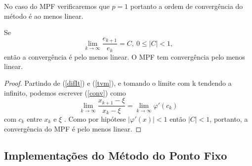 No caso do MPF verificaremos que $p = 1$ portanto a ordem de convergência do método é ao menos linear.
\begin{prop}
    Se 
    \begin{equation}\label{conv}
        \lim_{k \to \infty} \frac{e_{k+1}}{e_k} = C, \ 0 \leq |C| < 1,
    \end{equation}
    então a convergência é pelo menos linear. O MPF tem convergência pelo menos linear.
\end{prop}
\begin{proof}
Partindo de (\ref{difIt}) e (\ref{tvm}), e tomando o  limite com k tendendo a infinito, podemos escrever (\ref{conv}) como
\begin{equation*} %
    \lim_{k \to \infty} \frac{x_{k+1} - \xi}{x_k - \xi} = \lim_{k \to \infty}\varphi'(c_k)
\end{equation*} %
com $c_k$ entre $x_k$ e $\xi$
. %
Como por hipótese $|\varphi'(x)| < 1$ então $|C| < 1$, portanto, a convergência do MPF é pelo menos linear.
\end{proof}
\newpage

\subsection{Implementações do Método do Ponto Fixo}

